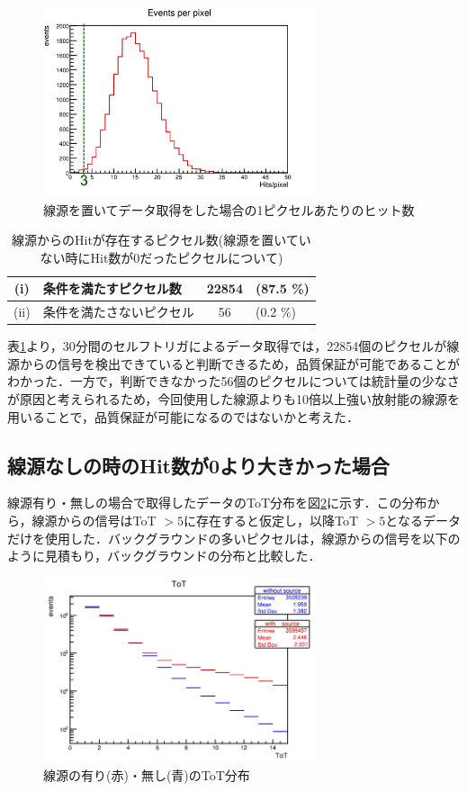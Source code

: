 \begin{figure}[h]
  \centering
  \includegraphics[width=8cm]{./figure/selfperpix.png}
  \caption{線源を置いてデータ取得をした場合の1ピクセルあたりのヒット数}
  \label{fig:numhitdist}
\end{figure}


\begin{table}[h]
  \centering
  \caption{線源からのHitが存在するピクセル数(線源を置いていない時にHit数が0だったピクセルについて)}
  \begin{tabular}{|cl|cl|} \hline
    (i) & 条件を満たすピクセル数 & 22854 & (87.5 \%) \\ \hline
    (ii) & 条件を満たさないピクセル & 56 & (0.2 \%) \\ \hline
  \end{tabular}
  \label{tab:0hitdist}
\end{table}

表\ref{tab:0hitdist}より，30分間のセルフトリガによるデータ取得では，22854個のピクセルが線源からの信号を検出できていると判断できるため，品質保証が可能であることがわかった．一方で，判断できなかった56個のピクセルについては統計量の少なさが原因と考えられるため，今回使用した線源よりも10倍以上強い放射能の線源を用いることで，品質保証が可能になるのではないかと考えた．

\subsection*{線源なしの時のHit数が0より大きかった場合}
線源有り・無しの場合で取得したデータのToT分布を図\ref{fig:selftot}に示す．この分布から，線源からの信号はToT $> 5$に存在すると仮定し，以降ToT $>5$となるデータだけを使用した．バックグラウンドの多いピクセルは，線源からの信号を以下のように見積もり，バックグラウンドの分布と比較した．

\begin{figure}[h]
  \centering
  \includegraphics[width=8cm]{./figure/selftot.png}
  \caption{線源の有り(赤)・無し(青)のToT分布}
  \label{fig:selftot}
\end{figure}


